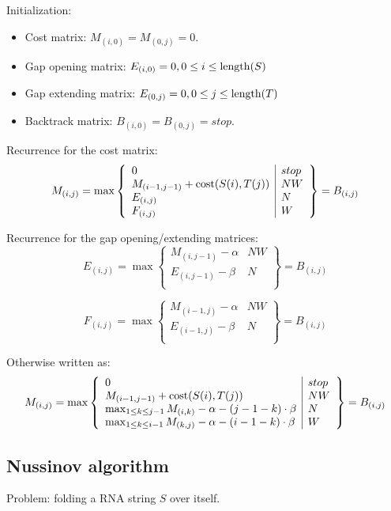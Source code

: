 \documentclass[11pt]{article}
\def\ul{\begin{itemize}}
\def\ule{\end{itemize}}
\begin{document}
Initialization:\ul
\item Cost matrix: $M_{(i,0)}=M_{(0,j)}=0$.
\item Gap opening matrix: $E_{(i,0)}= 0, 0 \le i \le {\rm length}(S)$
\item Gap extending matrix: $E_{(0,j)}= 0, 0 \le j \le {\rm length}(T)$
\item Backtrack matrix: $B_{(i,0)}=B_{(0,j)}=stop$.
\ule

Recurrence for the cost matrix:
\[M_{(i,j)}=\max\left\{\begin{array}{l|l}
	0 & stop\\
	M_{(i-1,j-1)}+{\rm cost}(S(i),T(j)) & NW\\
	E_{(i,j)} & N\\
	F_{(i,j)} & W
\end{array}\right\}=B_{(i,j)} \]

Recurrence for the gap opening/extending matrices:
\[E_{(i,j)}=\max\left\{\begin{array}{l|l}
	M_{(i, j-1)} - \alpha & NW\\
	E_{(i,j-1)} - \beta & N\\
\end{array}\right\}=B_{(i,j)} \]

\[F_{(i,j)}=\max\left\{\begin{array}{l|l}
	M_{(i-1, j)} - \alpha & NW\\
	E_{(i-1,j)} - \beta & N\\
\end{array}\right\}=B_{(i,j)} \]


Otherwise written as:
\[M_{(i,j)}=\max\left\{\begin{array}{l|l}
	0 & stop\\
	M_{(i-1,j-1)}+{\rm cost}(S(i),T(j)) & NW\\
	\max_{1 \le k \le j-1} M_{(i,k)} - \alpha - (j-1-k) \cdot \beta & N\\
	\max_{1 \le k \le i-1} M_{(k,j)} - \alpha - (i-1-k) \cdot \beta & W\\
\end{array}\right\}=B_{(i,j)} \]





\newpage
\subsection{Nussinov algorithm}
Problem: folding a RNA string $S$ over itself.
\end{document}
